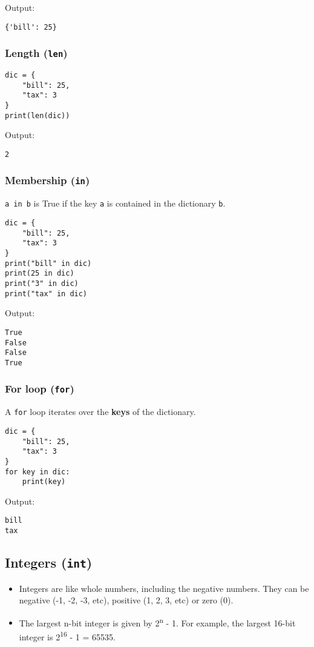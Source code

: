 \documentclass[11pt]{article}
\begin{document}
 \noindent Output:

\label{orga1ebd21}
\begin{verbatim}
{'bill': 25}
\end{verbatim}
\subsubsection{Length (\texttt{len})}
\label{sec:org033824c}
\begin{verbatim}
dic = {
    "bill": 25,
    "tax": 3
}
print(len(dic))
\end{verbatim}

 \noindent Output:

\label{org97163f2}
\begin{verbatim}
2
\end{verbatim}
\subsubsection{Membership (\texttt{in})}
\label{sec:orgf9203ca}
\texttt{a in b} is True if the key \texttt{a} is contained in the dictionary \texttt{b}.
\begin{verbatim}
dic = {
    "bill": 25,
    "tax": 3
}
print("bill" in dic)
print(25 in dic)
print("3" in dic)
print("tax" in dic)
\end{verbatim}

 \noindent Output:

\label{orgcb143a7}
\begin{verbatim}
True
False
False
True
\end{verbatim}


 \newpage
\subsubsection{For loop (\texttt{for})}
\label{sec:org86daf10}
A \texttt{for} loop iterates over the \textbf{keys} of the dictionary.
\begin{verbatim}
dic = {
    "bill": 25,
    "tax": 3
}
for key in dic:
    print(key)
\end{verbatim}

 \noindent Output:

\label{org8c4538b}
\begin{verbatim}
bill
tax
\end{verbatim}
\subsection{Integers (\texttt{int})}
\label{sec:orga3dce2c}
\begin{itemize}
\item Integers are like whole numbers, including the negative numbers. They can be negative (-1, -2, -3, etc), positive (1, 2, 3, etc) or zero (0).
\item The largest n-bit integer is given by 2\textsuperscript{n} - 1. For example, the largest 16-bit integer is 2\textsuperscript{16} - 1 = 65535.
\end{itemize}
\end{document}
